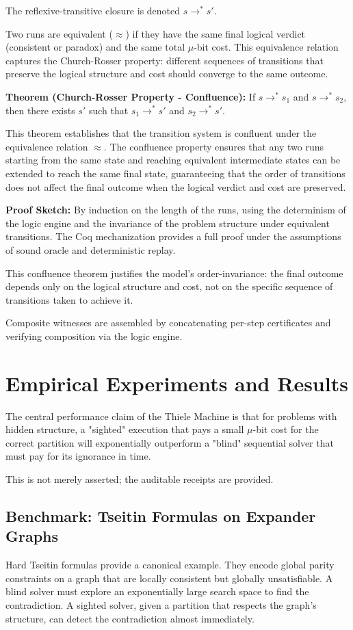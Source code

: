 \documentclass[11pt]{article}
\begin{document}
The reflexive-transitive closure is denoted $s \rightarrow^* s'$.

Two runs are equivalent ($\approx$) if they have the same final logical verdict (consistent or paradox) and the same total $\mu$-bit cost. This equivalence relation captures the Church-Rosser property: different sequences of transitions that preserve the logical structure and cost should converge to the same outcome.

\textbf{Theorem (Church-Rosser Property - Confluence):} If $s \rightarrow^* s_1$ and $s \rightarrow^* s_2$, then there exists $s'$ such that $s_1 \rightarrow^* s'$ and $s_2 \rightarrow^* s'$.

This theorem establishes that the transition system is confluent under the equivalence relation $\approx$. The confluence property ensures that any two runs starting from the same state and reaching equivalent intermediate states can be extended to reach the same final state, guaranteeing that the order of transitions does not affect the final outcome when the logical verdict and cost are preserved.

\textbf{Proof Sketch:} By induction on the length of the runs, using the determinism of the logic engine and the invariance of the problem structure under equivalent transitions. The Coq mechanization provides a full proof under the assumptions of sound oracle and deterministic replay.

This confluence theorem justifies the model's order-invariance: the final outcome depends only on the logical structure and cost, not on the specific sequence of transitions taken to achieve it.

Composite witnesses are assembled by concatenating per-step certificates and verifying composition via the logic engine.

\section{Empirical Experiments and Results}
The central performance claim of the Thiele Machine is that for problems with hidden structure, a "sighted" execution that pays a small $\mu$-bit cost for the correct partition will exponentially outperform a "blind" sequential solver that must pay for its ignorance in time.

This is not merely asserted; the auditable receipts are provided.

\subsection{Benchmark: Tseitin Formulas on Expander Graphs}
Hard Tseitin formulas provide a canonical example. They encode global parity constraints on a graph that are locally consistent but globally unsatisfiable. A blind solver must explore an exponentially large search space to find the contradiction. A sighted solver, given a partition that respects the graph's structure, can detect the contradiction almost immediately.
\end{document}
